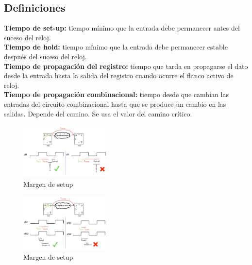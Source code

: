 \subsection{Definiciones}
\noindent\textbf{Tiempo de set-up:} tiempo mínimo que la entrada debe permanecer antes del suceso del reloj.\\
\textbf{Tiempo de hold:} tiempo mínimo que la entrada debe permanecer estable después del suceso del reloj.\\
\textbf{Tiempo de propagación del registro:} tiempo que tarda en propagarse el dato desde la entrada hasta la salida del registro cuando ocurre el flanco activo de reloj.\\
\textbf{Tiempo de propagación combinacional:} tiempo desde que cambian las entradas del circuito combinacional hasta que se produce un cambio en las salidas. Depende del camino. Se usa el valor del camino crítico.\\
\begin{multicols}{2}
	\begin{figure}[H]
		\centering
		\includegraphics[width=0.4\textwidth]{images/Tema_2/Margen_setup.PNG}
		\caption{Margen de setup}
	\end{figure}
	\vfill
	\null
	\begin{figure}[H]
		\centering
		\includegraphics[width=0.4\textwidth]{images/Tema_2/Margen_hold.PNG}
		\caption{Margen de setup}
	\end{figure}
\end{multicols}

